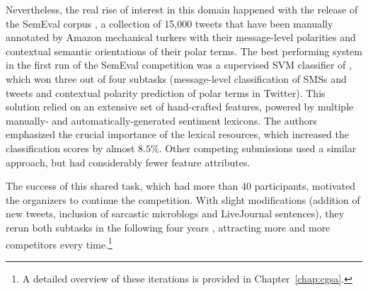 
Nevertheless, the real rise of interest in this domain happened with
the release of the Sem\-Eval corpus \cite{Nakov:13}, a collection of
15,000 tweets that have been manually annotated by Amazon mechanical
turkers with their message-level polarities and contextual semantic
orientations of their polar terms. The best performing system in the
first run of the SemEval competition was a supervised SVM classifier
of \citet{Mohammad:13}, which won three out of four subtasks
(message-level classification of SMSs and tweets and contextual
polarity prediction of polar terms in Twitter).  This solution relied
on an extensive set of hand-crafted features, powered by multiple
manually- and automatically-generated sentiment lexicons.  The authors
emphasized the crucial importance of the lexical resources, which
increased the classification scores by almost $8.5\%$.  Other
competing submissions \cite{Becker:13,Guenther:13,Kokciyan:13} used a
similar approach, but had considerably fewer feature attributes.

The success of this shared task, which had more than 40 participants,
motivated the organizers to continue the competition.  With slight
modifications (addition of new tweets, inclusion of sarcastic
microblogs and LiveJournal sentences), they rerun both subtasks in the
following four years
\cite{Rosenthal:14,Rosenthal:15,Nakov:16,Rosenthal:17}, attracting
more and more competitors every time.\footnote{A detailed overview of
  these iterations is provided in Chapter~\ref{chap:cgsa}.}


